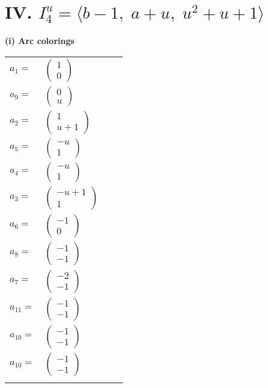 \documentclass[1p]{elsarticle_modified}
\theoremstyle{definition}
\begin{document}
\centering \section*{IV. $I^u_{4}= \langle b-1,\;a+u,\;u^2+u+1 \rangle$}
\flushleft \textbf{(i) Arc colorings}\\
\begin{tabular}{m{7pt} m{180pt} m{7pt} m{180pt} }
\flushright $a_{1}=$&$\begin{pmatrix}1\\0\end{pmatrix}$ \\
\flushright $a_{9}=$&$\begin{pmatrix}0\\u\end{pmatrix}$ \\
\flushright $a_{2}=$&$\begin{pmatrix}1\\u+1\end{pmatrix}$ \\
\flushright $a_{5}=$&$\begin{pmatrix}- u\\1\end{pmatrix}$ \\
\flushright $a_{4}=$&$\begin{pmatrix}- u\\1\end{pmatrix}$ \\
\flushright $a_{3}=$&$\begin{pmatrix}- u+1\\1\end{pmatrix}$ \\
\flushright $a_{6}=$&$\begin{pmatrix}-1\\0\end{pmatrix}$ \\
\flushright $a_{8}=$&$\begin{pmatrix}-1\\-1\end{pmatrix}$ \\
\flushright $a_{7}=$&$\begin{pmatrix}-2\\-1\end{pmatrix}$ \\
\flushright $a_{11}=$&$\begin{pmatrix}-1\\-1\end{pmatrix}$ \\
\flushright $a_{10}=$&$\begin{pmatrix}-1\\-1\end{pmatrix}$\\ \flushright $a_{10}=$&$\begin{pmatrix}-1\\-1\end{pmatrix}$\\&\end{tabular}
\end{document}
